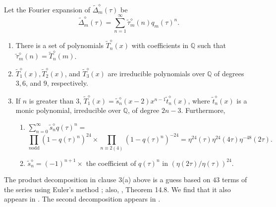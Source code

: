 \documentclass{article}
\begin{document}
\begin{conjecture}
Let the Fourier
expansion of $\widetilde{\Delta}^{\diamond}_m(\tau)$ be
$$
\widetilde{\Delta}^{\diamond}_m(\tau) = 
\sum_{n=1}^{\infty}  
\tilde{\tau}_m^{\diamond}(n) q_m(\tau)^n.
$$
\begin{enumerate}
\item There is a set of polynomials
$\widetilde{T}^{\diamond}_n(x)$
with coefficients in $\mathbb{Q}$ such that 
$\tilde{\tau}_m^{\diamond}(n) = 
\widetilde{T}^{\diamond}_n(m)$.
\item $\widetilde{T}^{\diamond}_1(x), 
\widetilde{T}^{\diamond}_2(x)$, and 
$\widetilde{T}^{\diamond}_3(x)$
are irreducible polynomials over $\mathbb{Q}$ of degrees
$3, 6$, and $9$, respectively.
\item If $n$ is greater than $3$,
$\widetilde{T}^{\diamond}_1(x) = 
\tilde{s}^{\diamond}_n(x-2)x^{n-1} \tilde{t}^{\diamond}_n(x)$, 
where $\tilde{t}^{\diamond}_n(x)$ is a monic
polynomial, irreducible 
over $\mathbb{Q}$, of degree $2n-3$.
Furthermore,
\begin{enumerate}
\item
$\sum_{n=0}^{\infty}
\tilde{s}^{\diamond}_n q(\tau)^n
=  $ 
$$
 \prod_{n \text{odd}}(1-q(\tau)^n)^{24} \times
\prod_{n \equiv 2 (4)}(1-q(\tau)^n)^{-24} = 
\eta^{24}(\tau) \eta^{24}(4\tau) \eta^{-48}(2\tau).
$$
\item
$\tilde{s}^{\diamond}_n = 
(-1)^{n+1} \times$ the coefficient 
of $q(\tau)^n$ in $(\eta(2\tau)/\eta(\tau))^{24}$.
\end{enumerate}
\end{enumerate}
\end{conjecture}
\noindent
The product decomposition in clause 3(a) above
is a guess based on $43$ terms of the series
using Euler's method \cite{eulerdiscovery};
also, \cite{apostolIntroduction}, Theorem 14.8.
We find that it also appears in
\cite{OEIS6}. The second decomposition
appears in \cite{OEIS7}.
\end{document}
